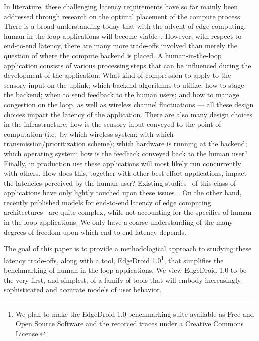In literature, these challenging latency requirements have so far mainly been addressed through research on the optimal placement of the compute process.
There is a broad understanding today that with the advent of edge computing, human-in-the-loop applications will become viable~\cite{bittmann2017edge,flinn2012cyber,chen2017empirical,ha2013just}.
However, with respect to end-to-end latency, there are many more trade-offs involved than merely the question of where the compute backend is placed.
A human-in-the-loop application consists of various processing steps that can be influenced during the development of the application.
What kind of compression to apply to the sensory input on the uplink; which backend algorithms to utilize; how to stage the backend; when to send feedback to the human users; and how to manage congestion on the loop, as well as wireless channel fluctuations --- all these design choices impact the latency of the application.
There are also many design choices in the infrastructure: how is the sensory input conveyed to the point of computation (i.e.\ by which wireless system; with which transmission/prioritization scheme); which hardware is running at the backend; which operating system; how is the feedback conveyed back to the human user?
Finally, in production use these applications will most likely run concurrently with others.
How does this, together with other best-effort applications, impact the latencies perceived by the human user?
Existing studies~\cite{ha2014towards,chen2015early,satyanarayanan2009case,chatzopoulos2017hyperion} of this class of applications have only lightly touched upon these issues~\cite{chen2017empirical}.
On the other hand, recently published models for end-to-end latency of edge computing architectures~\cite{al_zubaidy2015performance,schiessl2017finite} are quite complex, while not accounting for the specifics of human-in-the-loop applications.
We only have a coarse understanding of the many degrees of freedom upon which end-to-end latency depends.

The goal of this paper is to provide a methodological approach to studying these latency trade-offs, along with a tool, EdgeDroid 1.0\footnote{We plan to make the EdgeDroid 1.0 benchmarking suite available as Free and Open Source Software and the recorded traces under a Creative Commons License.}, that simplifies the benchmarking of human-in-the-loop applications.
We view EdgeDroid 1.0 to be the very first, and simplest, of a family of tools that will embody increasingly sophisticated and accurate models of user behavior.

